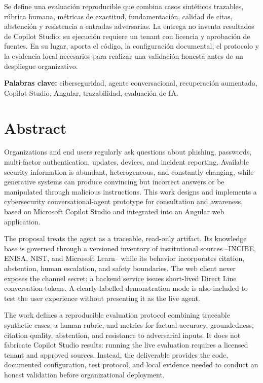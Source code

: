 \documentclass[12pt,twoside,titlepage]{book}
\begin{document}
Se define una evaluaci\'on reproducible que combina casos sint\'eticos trazables, r\'ubrica humana, m\'etricas de exactitud, fundamentaci\'on, calidad de citas, abstenci\'on y resistencia a entradas adversarias. La entrega no inventa resultados de Copilot Studio: su ejecuci\'on requiere un tenant con licencia y aprobaci\'on de fuentes. En su lugar, aporta el c\'odigo, la configuraci\'on documental, el protocolo y la evidencia local necesarios para realizar una validaci\'on honesta antes de un despliegue organizativo.

\vspace{0.4cm}
\noindent\textbf{Palabras clave:} ciberseguridad, agente conversacional, recuperaci\'on aumentada, Copilot Studio, Angular, trazabilidad, evaluaci\'on de IA.

\chapter*{Abstract}
Organizations and end users regularly ask questions about phishing, passwords, multi-factor authentication, updates, devices, and incident reporting. Available security information is abundant, heterogeneous, and constantly changing, while generative systems can produce convincing but incorrect answers or be manipulated through malicious instructions. This work designs and implements a cybersecurity conversational-agent prototype for consultation and awareness, based on Microsoft Copilot Studio and integrated into an Angular web application.

The proposal treats the agent as a traceable, read-only artifact. Its knowledge base is governed through a versioned inventory of institutional sources --INCIBE, ENISA, NIST, and Microsoft Learn-- while its behavior incorporates citation, abstention, human escalation, and safety boundaries. The web client never exposes the channel secret: a backend service issues short-lived Direct Line conversation tokens. A clearly labelled demonstration mode is also included to test the user experience without presenting it as the live agent.

The work defines a reproducible evaluation protocol combining traceable synthetic cases, a human rubric, and metrics for factual accuracy, groundedness, citation quality, abstention, and resistance to adversarial inputs. It does not fabricate Copilot Studio results: running the live evaluation requires a licensed tenant and approved sources. Instead, the deliverable provides the code, documented configuration, test protocol, and local evidence needed to conduct an honest validation before organizational deployment.
\end{document}
